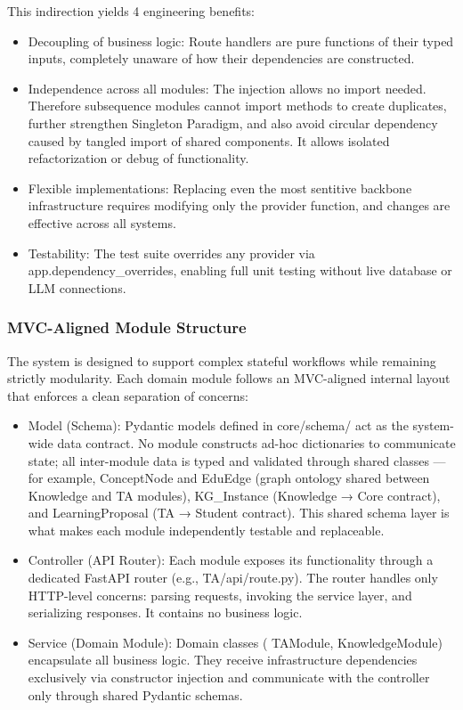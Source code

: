 This indirection yields 4 engineering benefits:
\begin{itemize}
  \item {Decoupling of business logic:} Route handlers are pure functions of their typed inputs, completely unaware of how their dependencies are constructed.
  \item {Independence across all modules:} The injection allows no import needed. Therefore subsequence modules cannot import methods to create duplicates, further 
  strengthen Singleton Paradigm, and also avoid circular dependency caused by tangled import of shared components. It allows isolated refactorization or debug of functionality.
  \item {Flexible implementations:} Replacing even the most sentitive backbone infrastructure requires modifying only the 
  provider function, and changes are effective across all systems.
  \item {Testability:} The test suite overrides any provider via  {app.dependency\_overrides}, enabling full unit testing without live database or LLM connections.
\end{itemize}

\subsubsection{MVC-Aligned Module Structure}\label{sec:mvc}
The system is designed to support complex stateful workflows while remaining strictly modularity. Each domain module follows an MVC-aligned internal layout that enforces a clean separation of concerns:

\begin{itemize}
\item {Model (Schema):} Pydantic models defined in  {core/schema/} act
as the system-wide data contract. No module constructs ad-hoc dictionaries to 
communicate state; all inter-module data is typed and validated through shared classes —
for example,  {ConceptNode} and  {EduEdge} (graph ontology shared between 
Knowledge and TA modules),  {KG\_Instance} (Knowledge → Core contract), and 
 {LearningProposal} (TA → Student contract). This shared schema layer is what 
makes each module independently testable and replaceable.
  \item {Controller (API Router):} Each module exposes its functionality through a dedicated FastAPI router (e.g.,  {TA/api/route.py}). The router handles only HTTP-level concerns: parsing requests, invoking the service layer, and serializing responses. It contains no business logic.
  \item {Service (Domain Module):} Domain classes ( {TAModule},  {KnowledgeModule}) encapsulate all business logic. They receive infrastructure dependencies exclusively via constructor injection and communicate with the controller only through shared Pydantic schemas.
\end{itemize}

